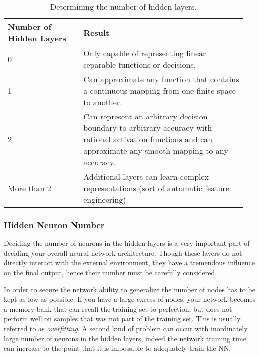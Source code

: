 \documentclass[]{scrartcl}
\begin{document}
\begin{center}
\begin{table}[htbp]
\begin{tabular}{|p{0.3\linewidth}|p{0.65\linewidth}|}
\hline
\vspace{1mm}
Number of Hidden Layers & \vspace{1mm} Result \vspace{2mm}\\
\hline
\vspace{0.2\baselineskip}
0 & Only capable of representing linear separable functions or decisions. \\
\hline
\vspace{0.2\baselineskip}
1 & Can approximate any function that contains a continuous mapping from one finite space to another.\\
\hline
\vspace{0.5\baselineskip}
2 & Can represent an arbitrary decision boundary to arbitrary accuracy with rational activation functions and can approximate any smooth mapping to any accuracy. \\
\hline
\vspace{0.1\baselineskip}
More than 2 & Additional layers can learn complex representations (sort of automatic feature engineering) \\
\hline
\end{tabular}
\caption{Determining the number of hidden layers.}
\label{tab:nn}
\end{table}
\end{center}

\subsubsection*{Hidden Neuron Number}

Deciding the number of neurons in the hidden layers is a very important part of deciding your overall neural network architecture. Though these layers do not directly interact with the external environment, they have a tremendous influence on the final output, hence their number must be carefully considered.

In order to secure the network ability to generalize the number of nodes has to be kept as low as possible. If you have a large excess of nodes, your network becomes a memory bank that can recall the training set to perfection, but does not perform well on samples that was not part of the training set. This is usually referred to as \emph{overfitting}.
A second kind of problem can occur with inordinately large number of neurons in the hidden layers, indeed the network training time can increase to the point that it is impossible to adequately train the NN. 
\end{document}
